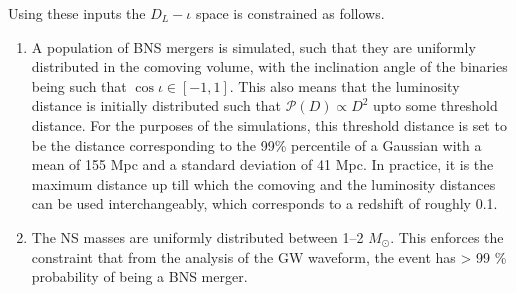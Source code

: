     Using these inputs the $D_L-\iota$ space is constrained as follows.
    \begin{enumerate}

        \item A population of BNS mergers is simulated, such that they are uniformly
            distributed in the comoving volume, with the inclination angle of the
            binaries being such that $\cos \iota \in [-1, 1]$. This also means that the
            luminosity distance is initially distributed such that $\mathcal{P}(D)
            \propto D^2$ upto some threshold distance. For the purposes of the
            simulations, this threshold distance is set to be the distance corresponding
            to the 99\% percentile of a Gaussian with a mean of 155 Mpc and a standard
            deviation of 41 Mpc. In practice, it is the maximum distance up till which
            the comoving and the luminosity distances can be used interchangeably, which
            corresponds to a redshift of roughly 0.1.

        \item The NS masses are uniformly distributed between 1--2 $M_{\odot}$. This
            enforces the constraint that from the analysis of the GW waveform, the event
            has > 99 \% probability of being a BNS merger.


\end{enumerate}
